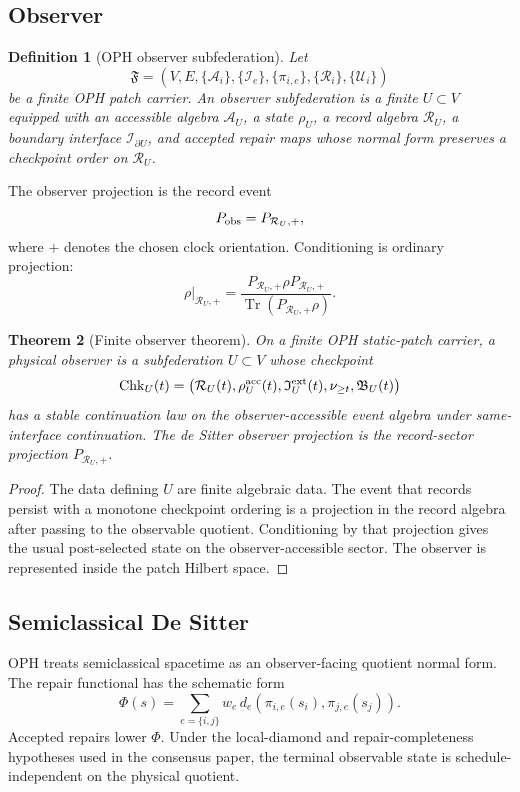 \documentclass[11pt]{article}
\newtheorem{theorem}{Theorem}[section]
\newtheorem{definition}[theorem]{Definition}
\theoremstyle{remark}
\theoremstyle{plain}
\newcommand{\Tr}{\operatorname{Tr}}
\newcommand{\calA}{\mathcal A}
\newcommand{\calR}{\mathcal R}
\newcommand{\calI}{\mathcal I}
\newcommand{\calU}{\mathcal U}
\begin{document}
\subsection{Observer}

\begin{definition}[OPH observer subfederation]
Let
\[
\mathfrak F=(V,E,\{\calA_i\},\{\calI_e\},\{\pi_{i,e}\},\{\calR_i\},\{\calU_i\})
\]
be a finite OPH patch carrier. An observer subfederation is a finite
\(U\subset V\) equipped with an accessible algebra \(\calA_U\), a state \(\rho_U\), a record
algebra \(\calR_U\), a boundary interface \(\calI_{\partial U}\), and accepted repair maps whose
normal form preserves a checkpoint order on \(\calR_U\).
\end{definition}

The observer projection is the record event
\[
P_{\rm obs}=P_{\calR_U,+},
\]
where \(+\) denotes the chosen clock orientation. Conditioning is ordinary projection:
\[
\rho|_{\calR_U,+}
=
\frac{P_{\calR_U,+}\rho P_{\calR_U,+}}{\Tr(P_{\calR_U,+}\rho)}.
\]

\begin{theorem}[Finite observer theorem]
On a finite OPH static-patch carrier, a physical observer is a subfederation \(U\subset V\) whose
checkpoint
\[
\mathrm{Chk}_U(t)=
\bigl(\calR_U(t),\rho_U^{\rm acc}(t),\mathfrak I_U^{\rm ext}(t),
\nu_{\ge t},\mathfrak B_U(t)\bigr)
\]
has a stable continuation law on the observer-accessible event algebra under same-interface
continuation. The de Sitter observer projection is the record-sector projection
\(P_{\calR_U,+}\).
\end{theorem}

\begin{proof}
The data defining \(U\) are finite algebraic data. The event that records persist with a
monotone checkpoint ordering is a projection in the record algebra after passing to the
observable quotient. Conditioning by that projection gives the usual post-selected state on the
observer-accessible sector. The observer is represented inside the patch Hilbert space.
\end{proof}

\subsection{Semiclassical De Sitter}

OPH treats semiclassical spacetime as an observer-facing quotient normal form. The repair
functional has the schematic form
\[
\Phi(s)=\sum_{e=\{i,j\}} w_e\,
d_e\!\left(\pi_{i,e}(s_i),\pi_{j,e}(s_j)\right).
\]
Accepted repairs lower \(\Phi\). Under the local-diamond and repair-completeness hypotheses used
in the consensus paper, the terminal observable state is schedule-independent on the physical
quotient.
\end{document}
